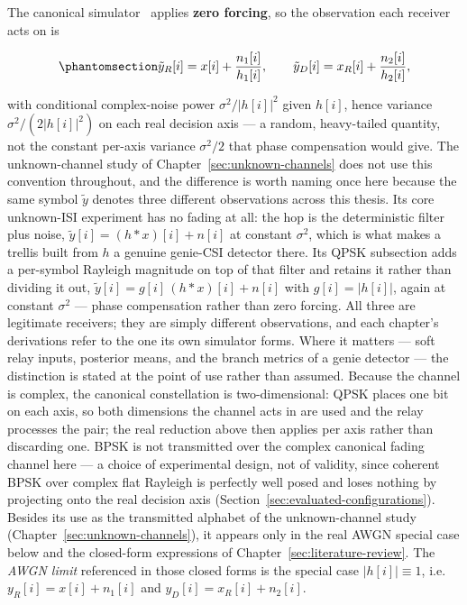 The canonical simulator~ applies \textbf{zero forcing}, so the observation each receiver acts on is

\begin{equation}\protect\phantomsection\label{eq:awgn-hop1}{\tilde{y}_R[i] = x[i] + \frac{n_1[i]}{h_1[i]}, \qquad \tilde{y}_D[i] = x_R[i] + \frac{n_2[i]}{h_2[i]},
}\end{equation}

with conditional complex-noise power $\sigma^{2}/|h[i]|^{2}$ given $h[i]$, hence variance $\sigma^{2}/(2|h[i]|^{2})$ on each real decision axis --- a random, heavy-tailed quantity, not the constant per-axis variance $\sigma^{2}/2$ that phase compensation would give. The unknown-channel study of Chapter~\ref{sec:unknown-channels} does not use this convention throughout, and the difference is worth naming once here because the same symbol $\tilde{y}$ denotes three different observations across this thesis. Its core unknown-ISI experiment has no fading at all: the hop is the deterministic filter plus noise, $\tilde{y}[i] = (h \ast x)[i] + n[i]$ at constant $\sigma^{2}$, which is what makes a trellis built from $h$ a genuine genie-CSI detector there. Its QPSK subsection adds a per-symbol Rayleigh magnitude on top of that filter and retains it rather than dividing it out, $\tilde{y}[i] = g[i]\,(h \ast x)[i] + n[i]$ with $g[i] = |h[i]|$, again at constant $\sigma^{2}$ --- phase compensation rather than zero forcing. All three are legitimate receivers; they are simply different observations, and each chapter's derivations refer to the one its own simulator forms. Where it matters --- soft relay inputs, posterior means, and the branch metrics of a genie detector --- the distinction is stated at the point of use rather than assumed. Because the channel is complex, the canonical constellation is two-dimensional: QPSK places one bit on each axis, so both dimensions the channel acts in are used and the relay processes the pair; the real reduction above then applies per axis rather than discarding one. BPSK is not transmitted over the complex canonical fading channel here --- a choice of experimental design, not of validity, since coherent BPSK over complex flat Rayleigh is perfectly well posed and loses nothing by projecting onto the real decision axis (Section~\ref{sec:evaluated-configurations}). Besides its use as the transmitted alphabet of the unknown-channel study (Chapter~\ref{sec:unknown-channels}), it appears only in the real AWGN special case below and the closed-form expressions of Chapter~\ref{sec:literature-review}. The \emph{AWGN limit} referenced in those closed forms is the special case $|h[i]| \equiv 1$, i.e.\ $y_R[i] = x[i] + n_1[i]$ and $y_D[i] = x_R[i] + n_2[i]$.

